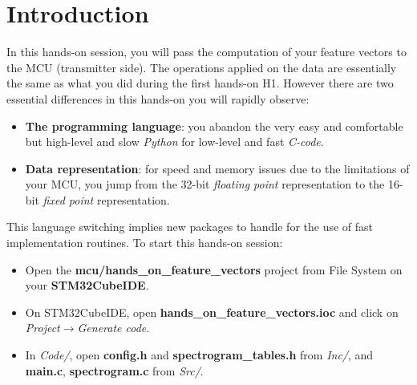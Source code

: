\section*{Introduction}
%
In this hands-on session, you will pass the computation of your feature vectors to the MCU (transmitter side).
The operations applied on the data are essentially the same as what you did during the first hands-on H1.
However there are two essential differences in this hands-on you will rapidly observe:
\begin{itemize}
    \item \textbf{The programming language}: you abandon the very easy and comfortable but high-level and slow \emph{Python} for low-level and fast \emph{C-code}.
    \item \textbf{Data representation}: for speed and memory issues due to the limitations of your MCU, you jump from the 32-bit \emph{floating point} representation to the 16-bit \emph{fixed point} representation.
\end{itemize}
%
This language switching implies new packages to handle for the use of fast implementation routines.
To start this hands-on session:
\begin{itemize}
    \item Open the \textbf{mcu/hands\_on\_feature\_vectors} project from File System on your \textbf{STM32CubeIDE}. 
    \item On STM32CubeIDE, open \textbf{hands\_on\_feature\_vectors.ioc} and click on \emph{Project$\rightarrow$Generate code}.
    \item In \emph{Code/}, open \textbf{config.h} and \textbf{spectrogram\_tables.h} from \emph{Inc/}, and \textbf{main.c}, \textbf{spectrogram.c} from \emph{Src/}.
\end{itemize}